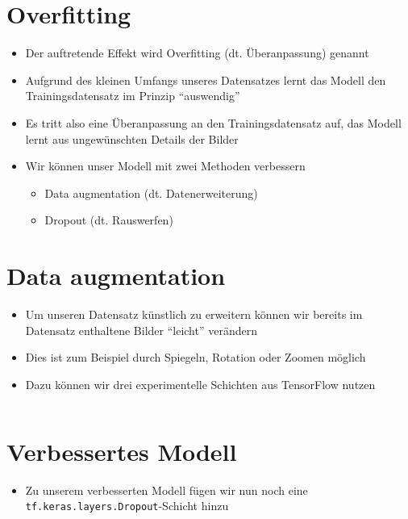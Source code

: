 \documentclass[t]{beamer}
\newcommand\pycode[1]{\inputminted[frame=lines, framesep=2mm, fontsize=\normalsize]{python}{#1}}
\begin{document}
\section{Overfitting}
\begin{frame}
    \begin{itemize}
        \item Der auftretende Effekt wird Overfitting (dt. Überanpassung) genannt
        \item Aufgrund des kleinen Umfangs unseres Datensatzes lernt das Modell den Trainingsdatensatz im Prinzip \enquote{auswendig}
        \item Es tritt also eine Überanpassung an den Trainingsdatensatz auf, das Modell lernt aus ungewünschten Details der Bilder
        \newline
        \item Wir können unser Modell mit zwei Methoden verbessern
        \begin{itemize}
            \item Data augmentation (dt. Datenerweiterung)
            \item Dropout (dt. Rauswerfen)
        \end{itemize}
    \end{itemize}
\end{frame}

\section{Data augmentation}
\begin{frame}
    \begin{itemize}
        \item Um unseren Datensatz künstlich zu erweitern können wir bereits im Datensatz enthaltene Bilder \enquote{leicht} verändern
        \item Dies ist zum Beispiel durch Spiegeln, Rotation oder Zoomen möglich
        \newline
        \item Dazu können wir drei experimentelle Schichten aus TensorFlow nutzen
        \pycode{./code-snippets/data-aug.py}
    \end{itemize}
\end{frame}

\section{Verbessertes Modell}
\begin{frame}
    \begin{itemize}
        \item Zu unserem verbesserten Modell fügen wir nun noch eine \texttt{tf.keras.layers.Dropout}-Schicht hinzu
        \pycode{./code-snippets/improved-model.py}
    \end{itemize}
\end{frame}
\end{document}
